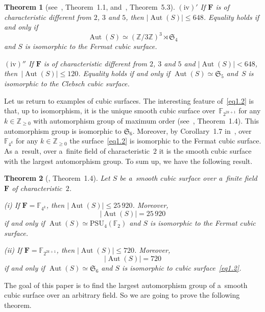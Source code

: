 \documentclass{amsart}
\numberwithin{equation}{section}
\theoremstyle{plain}
\newtheorem{theorem}{Theorem}
\theoremstyle{definition}
\theoremstyle{remark}
\begin{document}
\begin{theorem}[{see~\cite{8}, Theorem~1.1, and~\cite{11}, Theorem~5.3}]
$(\mathrm{iv})'$ If\/ $\mathbf{F}$ is of characteristic different from $2$, $3$ and $5$, then $|{\operatorname{Aut}(S)}| \leqslant 648$. Equality holds if and only if
$$
\operatorname{Aut}(S) \simeq (\mathbb{Z}/3\mathbb{Z})^3 \rtimes \mathfrak{S}_4
$$
and $S$ is isomorphic to the Fermat cubic surface.

$(\mathrm{iv})''$ If\/ $\mathbf{F}$ is of characteristic different from $2$, $3$ and $5$ and $|{\operatorname{Aut}(S)}| < 648$, then~\mbox{$|{\operatorname{Aut}(S)}| \leqslant 120$.} Equality holds if and only if $\operatorname{Aut}(S) \simeq \mathfrak{S}_5$ and~$S$ is isomorphic to the Clebsch cubic surface.
\end{theorem}

Let us return to examples of cubic surfaces. The interesting feature of~\eqref{eq1.2} is that, up to isomorphism, it is the unique smooth cubic surface over~$\mathbb{F}_{2^{2k+1}}$ for any $k \in \mathbb{Z}_{\geqslant 0}$ with automorphism group of maximum order (see~\cite{18}, Theorem~1.4). This automorphism group is isomorphic to $\mathfrak{S}_6$. Moreover, by Corollary~1.7 in~\cite{18}, over~$\mathbb{F}_{4^{k}}$ for any $k \in \mathbb{Z}_{\geqslant 0}$ the surface~\eqref{eq1.2} is isomorphic to the Fermat cubic surface. As a~result, over a~finite field of characteristic~$2$ it is the smooth cubic surface with the largest automorphism group. To sum up, we have the following result.

\begin{theorem}[{\cite{18}, Theorem~1.4}]
\label{t2}
Let $S$ be a~smooth cubic surface over a~finite field~$\mathbf{F}$ of characteristic~$2$.

{\rm (i)}
If\/ $\mathbf{F}=\mathbb{F}_{4^k}$, then $|{\operatorname{Aut}(S)}| \leqslant 25\, 920$. Moreover,
$$
|{\operatorname{Aut}(S)}| = 25\, 920
$$
if and only if
$\operatorname{Aut}(S) \simeq \mathrm{PSU}_4(\mathbb{F}_2)$
and $S$ is isomorphic to the Fermat cubic surface.

{\rm (ii)}
If\/ $\mathbf{F}=\mathbb{F}_{2^{2k+1}}$, then $|{\operatorname{Aut}(S)}| \leqslant 720$. Moreover,
$$
|{\operatorname{Aut}(S)}| = 720
$$
if and only if $\operatorname{Aut}(S) \simeq \mathfrak{S}_6$ and $S$ is isomorphic to cubic surface~\eqref{eq1.2}.
\end{theorem}

The goal of this paper is to find the largest automorphism group of a~smooth cubic surface over an arbitrary field. So we are going to prove the following theorem.
\end{document}
